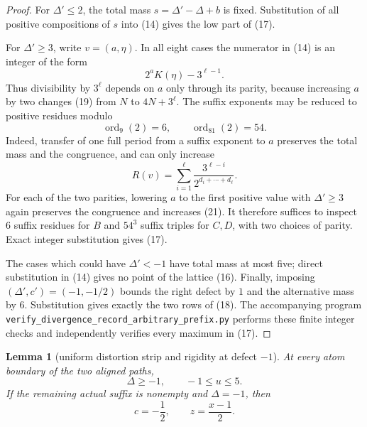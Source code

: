 \documentclass[11pt]{article}
\newtheorem{lemma}[theorem]{Lemma}
\begin{document}
\begin{proof}
For $\Delta'\leq2$, the total mass
$s=\Delta'-\Delta+b$ is fixed.  Substitution of all positive
compositions of $s$ into (14) gives the low part of (17).

For $\Delta'\geq3$, write $v=(a,\eta)$.  In all eight cases the numerator
in (14) is an integer of the form
\[
 2^aK(\eta)-3^{\ell-1}.
 \tag{19}
\]
Thus divisibility by $3^\ell$ depends on $a$ only through its parity,
because increasing $a$ by two changes (19) from $N$ to
$4N+3^\ell$.  The suffix exponents may be reduced to positive residues
modulo
\[
 \operatorname{ord}_{9}(2)=6,
 \qquad
 \operatorname{ord}_{81}(2)=54.
 \tag{20}
\]
Indeed, transfer of one full period from a suffix exponent to $a$
preserves the total mass and the congruence, and can only increase
\[
 R(v)=\sum_{i=1}^{\ell}
 \frac{3^{\ell-i}}{2^{d_i+\cdots+d_\ell}}.
 \tag{21}
\]
\newpage
For each of the two parities, lowering $a$ to the first positive value
with $\Delta'\geq3$ again preserves the congruence and increases (21).
It therefore suffices to inspect $6$ suffix residues for $B$ and
$54^3$ suffix triples for $C,D$, with two choices of parity.  Exact
integer substitution gives (17).

The cases which could have $\Delta'<-1$ have total mass at most five;
direct substitution in (14) gives no point of the lattice (16).
Finally, imposing $(\Delta',c')=(-1,-1/2)$ bounds the right defect by
$1$ and the alternative mass by $6$.  Substitution gives exactly the two
rows of (18).  The accompanying program
\texttt{verify\_divergence\_record\_arbitrary\_prefix.py} performs these
finite integer checks and independently verifies every maximum in (17).
\end{proof}

\begin{lemma}[uniform distortion strip and rigidity at defect $-1$]
At every atom boundary of the two aligned paths,
\[
 \boxed{\Delta\geq-1,\qquad -1\leq u\leq5.}
 \tag{22}
\]
If the remaining actual suffix is nonempty and $\Delta=-1$, then
\[
 \boxed{c=-\frac12,\qquad z=\frac{x-1}{2}.}
 \tag{23}
\]
\end{lemma}
\end{document}
